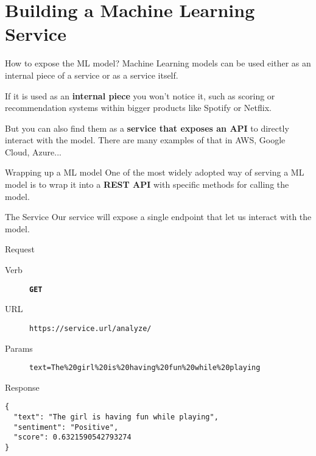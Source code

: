 \section{Building a Machine Learning Service}
\begin{frame}{How to expose the ML model?}
    Machine Learning models can be used either as an internal piece of a service or as a service itself.

    \pause

    If it is used as an \textbf{internal piece} you won't notice it, such as scoring or recommendation systems within bigger products like Spotify or Netflix.

    \pause

    But you can also find them as a \textbf{service that exposes an API} to directly interact with the model. There are many examples of that in AWS, Google Cloud, Azure...
\end{frame}

\begin{frame}{Wrapping up a ML model}
    One of the most widely adopted way of serving a ML model is to wrap it into a \textbf{REST API} with specific methods for calling the model.
\end{frame}

\begin{frame}[fragile]{The Service}
    Our service will expose a single endpoint that let us interact with the model.

    \begin{exampleblock}{Request}
        {
            \footnotesize
            \begin{description}
                \item[Verb] \texttt{\textbf{GET}}
                \item[URL] \texttt{https://service.url/analyze/}
                \item[Params] \texttt{text=The\%20girl\%20is\%20having\%20fun\%20while\%20playing}
            \end{description}
        }
    \end{exampleblock}

    \begin{exampleblock}{Response}
        \begin{verbatim}
{
  "text": "The girl is having fun while playing",
  "sentiment": "Positive",
  "score": 0.6321590542793274
}
        \end{verbatim}
    \end{exampleblock}
\end{frame}

